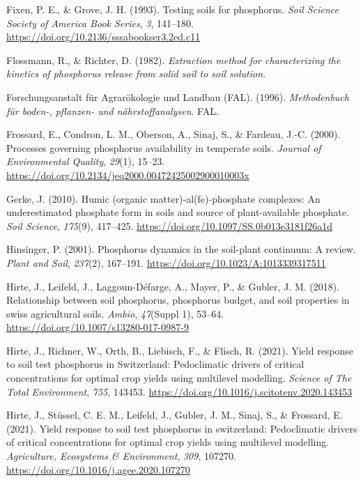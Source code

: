 \documentclass[
  a4paper,
]{article}
\newlength{\cslhangindent}
\newenvironment{CSLReferences}[2] %
 {\begin{list}{}{%
  \setlength{\itemindent}{0pt}
  \setlength{\leftmargin}{0pt}
  \setlength{\parsep}{0pt}
  \ifodd #1
   \setlength{\leftmargin}{\cslhangindent}
   \setlength{\itemindent}{-1\cslhangindent}
  \fi
  \setlength{\itemsep}{#2\baselineskip}}}
 {\end{list}}
\begin{document}
\begin{CSLReferences}{1}{0}
Fixen, P. E., \& Grove, J. H. (1993). Testing soils for phosphorus.
\emph{Soil Science Society of America Book Series}, \emph{3}, 141--180.
\url{https://doi.org/10.2136/sssabookser3.2ed.c11}

Flossmann, R., \& Richter, D. (1982). \emph{Extraction method for
characterizing the kinetics of phosphorus release from solid soil to
soil solution.}

Forschungsanstalt für Agrarökologie und Landbau (FAL). (1996).
\emph{Methodenbuch für boden-, pflanzen- und nährstoffanalysen}. FAL.

Frossard, E., Condron, L. M., Oberson, A., Sinaj, S., \& Fardeau, J.-C.
(2000). Processes governing phosphorus availability in temperate soils.
\emph{Journal of Environmental Quality}, \emph{29}(1), 15--23.
\url{https://doi.org/10.2134/jeq2000.00472425002900010003x}

Gerke, J. (2010). Humic (organic matter)-al(fe)-phosphate complexes: An
underestimated phosphate form in soils and source of plant-available
phosphate. \emph{Soil Science}, \emph{175}(9), 417--425.
\url{https://doi.org/10.1097/SS.0b013e3181f26a1d}

Hinsinger, P. (2001). Phosphorus dynamics in the soil-plant continuum: A
review. \emph{Plant and Soil}, \emph{237}(2), 167--191.
\url{https://doi.org/10.1023/A:1013339317511}

Hirte, J., Leifeld, J., Laggoun-Défarge, A., Mayer, P., \& Gubler, J. M.
(2018). Relationship between soil phosphorus, phosphorus budget, and
soil properties in swiss agricultural soils. \emph{Ambio},
\emph{47}(Suppl 1), 53--64.
\url{https://doi.org/10.1007/s13280-017-0987-9}

Hirte, J., Richner, W., Orth, B., Liebisch, F., \& Flisch, R. (2021).
Yield response to soil test phosphorus in {Switzerland}: {Pedoclimatic}
drivers of critical concentrations for optimal crop yields using
multilevel modelling. \emph{Science of The Total Environment},
\emph{755}, 143453.
\url{https://doi.org/10.1016/j.scitotenv.2020.143453}

Hirte, J., Stüssel, C. E. M., Leifeld, J., Gubler, J. M., Sinaj, S., \&
Frossard, E. (2021). Yield response to soil test phosphorus in
switzerland: Pedoclimatic drivers of critical concentrations for optimal
crop yields using multilevel modelling. \emph{Agriculture, Ecosystems \&
Environment}, \emph{309}, 107270.
\url{https://doi.org/10.1016/j.agee.2020.107270}


\end{CSLReferences}
\end{document}
